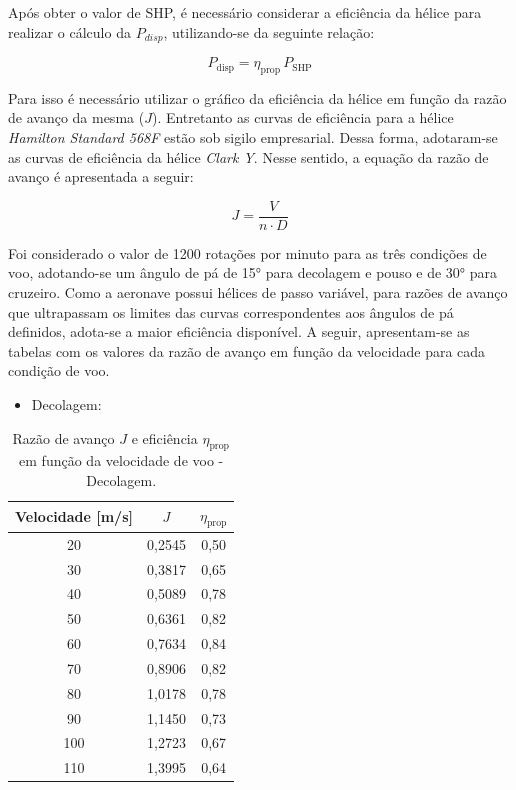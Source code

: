 Após obter o valor de SHP, é necessário considerar a eficiência da hélice para realizar o cálculo da $P_{disp}$, utilizando-se da seguinte relação:

\begin{equation}
    P_{\mathrm{disp}} = \eta_{\mathrm{prop}}\,P_{\mathrm{SHP}}
    \label{eq:pdisp}
\end{equation}

Para isso é necessário utilizar o gráfico da eficiência da hélice em função da razão de avanço da mesma ($J$). Entretanto as curvas de eficiência para a hélice \textit{Hamilton Standard 568F} estão sob sigilo empresarial. Dessa forma, adotaram-se as curvas de eficiência da hélice \textit{Clark Y}. Nesse sentido, a equação da razão de avanço é apresentada a seguir:



\begin{equation}
J = \frac{V}{n \cdot D}
\label{eq:avanco}
\end{equation}


Foi considerado o valor de 1200 rotações por minuto para as três condições de voo, adotando-se um ângulo de pá de 15° para decolagem e pouso e de 30° para cruzeiro. Como a aeronave possui hélices de passo variável, para razões de avanço que ultrapassam os limites das curvas correspondentes aos ângulos de pá definidos, adota-se a maior eficiência disponível. A seguir, apresentam-se as tabelas com os valores da razão de avanço em função da velocidade para cada condição de voo.

\begin{itemize}
    \item{Decolagem:}
\end{itemize}


\begin{table}[H]
\centering
\caption{Razão de avanço $J$ e eficiência $\eta_{\mathrm{prop}}$ em função da velocidade de voo - Decolagem.}
\begin{tabular}{ccc}
\hline
Velocidade [m/s] & $J$ & $\eta_{\mathrm{prop}}$ \\
\hline
20 & 0{,}2545 & 0{,}50 \\
30 & 0{,}3817 & 0{,}65 \\
40 & 0{,}5089 & 0{,}78 \\
50 & 0{,}6361 & 0{,}82 \\
60 & 0{,}7634 & 0{,}84 \\
70 & 0{,}8906 & 0{,}82 \\
80 & 1{,}0178 & 0{,}78 \\
90 & 1{,}1450 & 0{,}73 \\
100 & 1{,}2723 & 0{,}67 \\
110 & 1{,}3995 & 0{,}64 \\
\hline
\end{tabular}
\end{table}


